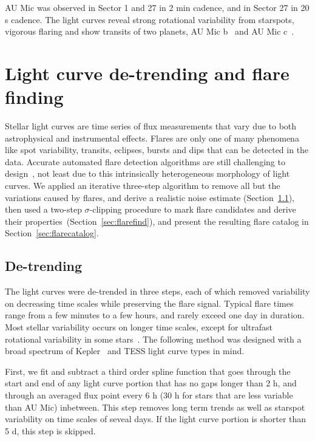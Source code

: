\documentclass[fleqn,usenatbib,letters]{mnras}%
\begin{document}
AU Mic was observed in Sector 1 and 27 in 2 min cadence, and in Sector 27 in 20 s cadence. The light curves reveal strong rotational variability from starspots, vigorous flaring and show transits of two planets, AU Mic b~\citep{plavchan2020,martioli2021new} and AU Mic c~\citep{plavchan2020,martioli2021new}.

\section{Light curve de-trending and flare finding}
\label{sec:detrendfind}
Stellar light curves are time series of flux measurements that vary due to both astrophysical and instrumental effects. Flares are only one of many phenomena like spot variability, transits, eclipses, bursts and dips that can be detected in the data. Accurate automated flare detection algorithms are still challenging to design~\citep{vida2021}, not least due to this intrinsically heterogeneous morphology of light curves. We applied an iterative three-step algorithm to remove all but the variations caused by flares, and derive a realistic noise estimate (Section~\ref{sec:detrend}), then used a two-step $\sigma$-clipping procedure to mark flare candidates and derive their properties~(Section~\ref{sec:flarefind}), and present the resulting flare catalog in Section~\ref{sec:flarecatalog}.

\subsection{De-trending}
\label{sec:detrend}
The light curves were de-trended in three steps, each of which removed variability on decreasing time scales while preserving the flare signal. Typical flare times range from a few minutes to a few hours, and rarely exceed one day in duration. Most stellar variability occurs on longer time scales, except for ultrafast rotational variability in some stars~\citep{ilin2021giant}. The following method was designed with a broad spectrum of Kepler~\citep{borucki2010} and TESS light curve types in mind. %

First, we fit and subtract a third order spline function that goes through the start and end of any light curve portion that has no gaps longer than 2 h, and through an averaged flux point every 6 h (30 h for stars that are less variable than AU Mic) inbetween. This step removes long term trends as well as starspot variability on time scales of seveal days. If the light curve portion is shorter than 5 d, this step is skipped. 
\end{document}

